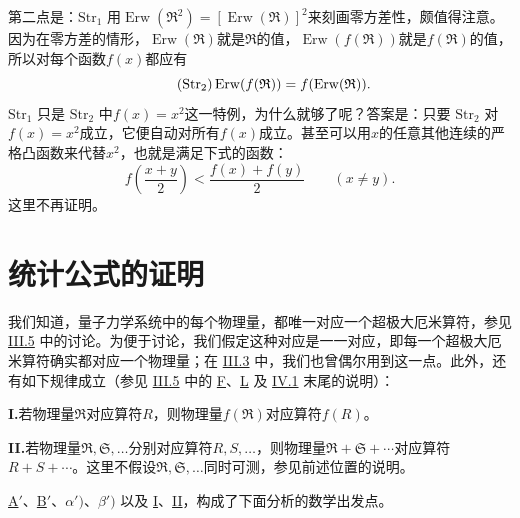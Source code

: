 \documentclass[fontsize=13pt,twoside,openany,headings=normal,parskip=false,bookmarkpackage=false,DIV=calc]{scrbook}
\begin{document}
第二点是：\hyperref[eq:IV.1.Str1]{$\mathrm{Str}_1$} 用$\operatorname{Erw}(\mathfrak R^2)=[\operatorname{Erw}(\mathfrak R)]^2$来刻画零方差性，颇值得注意。因为在零方差的情形，$\operatorname{Erw}(\mathfrak R)$就是$\mathfrak R$的值，$\operatorname{Erw}(f(\mathfrak R))$就是$f(\mathfrak R)$的值，所以对每个函数$f(x)$都应有
\begin{equation}\tag{$\mathrm{Str}_2$}\label{eq:IV.1.Str2}
\operatorname{Erw}(f(\mathfrak R))=f(\operatorname{Erw}(\mathfrak R)).
\end{equation}
\hyperref[eq:IV.1.Str1]{$\mathrm{Str}_1$} 只是 \hyperref[eq:IV.1.Str2]{$\mathrm{Str}_2$} 中$f(x)=x^2$这一特例，为什么就够了呢？答案是：只要 \hyperref[eq:IV.1.Str2]{$\mathrm{Str}_2$} 对$f(x)=x^2$成立，它便自动对所有$f(x)$成立。甚至可以用$x$的任意其他连续的严格凸函数来代替$x^2$，也就是满足下式的函数：
\[
f\left(\frac{x+y}{2}\right)<\frac{f(x)+f(y)}2\qquad(x\ne y).
\]
这里不再证明。

\hypertarget{origpage-167}{}\label{origpage-167}\section{统计公式的证明}\label{sec:IV.2}
我们知道，量子力学系统中的每个物理量，都唯一对应一个超极大厄米算符，参见 \hyperref[sec:III.5]{III.5} 中的讨论。为便于讨论，我们假定这种对应是一一对应，即每一个超极大厄米算符确实都对应一个物理量；在 \hyperref[sec:III.3]{III.3} 中，我们也曾偶尔用到这一点。此外，还有如下规律成立（参见 \hyperref[sec:III.5]{III.5} 中的 \hyperref[post:III.5.F]{F}、\hyperref[post:III.5.L]{L} 及 \hyperref[sec:IV.1]{IV.1} 末尾的说明）：

\noindent{}\textbf{I.}\label{cond:IV.2.I}若物理量$\mathfrak R$对应算符$R$，则物理量$f(\mathfrak R)$对应算符$f(R)$。

\noindent{}\textbf{II.}\label{cond:IV.2.II}若物理量$\mathfrak R,\allowbreak \mathfrak S,\allowbreak \ldots$分别对应算符$R,\allowbreak S,\allowbreak \ldots$，则物理量$\mathfrak R+\mathfrak S+\cdots$对应算符$R+S+\cdots$。这里不假设$\mathfrak R,\allowbreak \mathfrak S,\allowbreak \ldots$同时可测，参见前述位置的说明。

\hyperref[cond:IV.Aprime]{A$'$}、\hyperref[cond:IV.Bprime]{B$'$}、\hyperref[def:IV.1.alphaprime]{$\alpha')$}、\hyperref[def:IV.1.betaprime]{$\beta')$} 以及 \hyperref[cond:IV.2.I]{I}、\hyperref[cond:IV.2.II]{II}，构成了下面分析的数学出发点。
\end{document}
